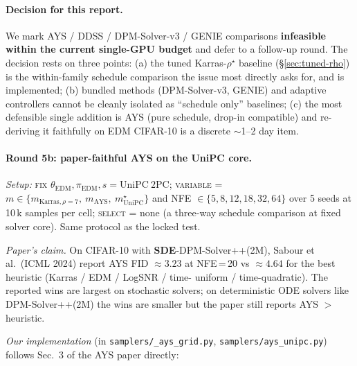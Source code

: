 \documentclass[11pt]{article}
\begin{document}
\paragraph{Decision for this report.} We mark AYS / DDSS / DPM-Solver-v3
/ GENIE comparisons \textbf{infeasible within the current single-GPU
budget} and defer to a follow-up round. The decision rests on three
points: (a) the tuned Karras-\(\rho^\star\) baseline
(\S\ref{sec:tuned-rho}) is the within-family schedule comparison the
issue most directly asks for, and is implemented; (b) bundled methods
(DPM-Solver-v3, GENIE) and adaptive controllers cannot be cleanly
isolated as ``schedule only'' baselines; (c) the most defensible
single addition is AYS (pure schedule, drop-in compatible) and
re-deriving it faithfully on EDM CIFAR-10 is a discrete \(\sim\)1--2
day item.

\paragraph{Round 5b: paper-faithful AYS on the UniPC core.}
\label{sec:ays}
\noindent\textit{Setup:} \textsc{fix} \(\theta_{\mathrm{EDM}},
\pi_{\mathrm{EDM}}, s = \mathrm{UniPC\ 2PC}\); \textsc{variable} =
\(m \in \{m_{\mathrm{Karras},\rho=7},\ m_{\mathrm{AYS}},\ m^\star_{\mathrm{UniPC}}\}\)
and NFE \(\in \{5,8,12,18,32,64\}\) over 5 seeds at 10\,k samples
per cell; \textsc{select} = none (a three-way schedule comparison at
fixed solver core). Same protocol as the locked test.

\emph{Paper's claim.} On CIFAR-10 with \textbf{SDE}-DPM-Solver++(2M),
Sabour et al.\ (ICML 2024) report AYS FID \(\approx 3.23\) at NFE\,=\,20
vs \(\approx 4.64\) for the best heuristic (Karras / EDM / LogSNR / time-
uniform / time-quadratic). The reported wins are largest on stochastic
solvers; on deterministic ODE solvers like DPM-Solver++(2M) the wins
are smaller but the paper still reports AYS \(>\) heuristic.

\emph{Our implementation} (in \texttt{samplers/\_ays\_grid.py},
\texttt{samplers/ays\_unipc.py}) follows Sec.~3 of the AYS paper
directly:
\end{document}
